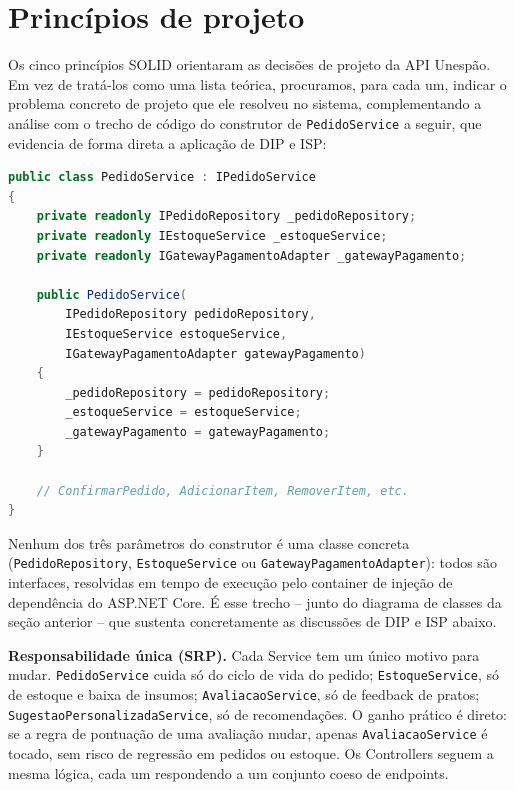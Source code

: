 \documentclass[a4paper,12pt,oneside,openany]{book}
\begin{document}
\section{Princípios de projeto}

Os cinco princípios SOLID orientaram as decisões de projeto da API Unespão. Em vez de tratá-los como uma lista teórica, procuramos, para cada um, indicar o problema concreto de projeto que ele resolveu no sistema, complementando a análise com o trecho de código do construtor de \texttt{PedidoService} a seguir, que evidencia de forma direta a aplicação de DIP e ISP:

\begin{lstlisting}[language=csharp, caption={Construtor de \texttt{PedidoService}, com suas três dependências expressas como interfaces.}]
public class PedidoService : IPedidoService
{
    private readonly IPedidoRepository _pedidoRepository;
    private readonly IEstoqueService _estoqueService;
    private readonly IGatewayPagamentoAdapter _gatewayPagamento;

    public PedidoService(
        IPedidoRepository pedidoRepository,
        IEstoqueService estoqueService,
        IGatewayPagamentoAdapter gatewayPagamento)
    {
        _pedidoRepository = pedidoRepository;
        _estoqueService = estoqueService;
        _gatewayPagamento = gatewayPagamento;
    }

    // ConfirmarPedido, AdicionarItem, RemoverItem, etc.
}
\end{lstlisting}

Nenhum dos três parâmetros do construtor é uma classe concreta (\texttt{PedidoRepository}, \texttt{EstoqueService} ou \texttt{GatewayPagamentoAdapter}): todos são interfaces, resolvidas em tempo de execução pelo container de injeção de dependência do ASP.NET Core. É esse trecho -- junto do diagrama de classes da seção anterior -- que sustenta concretamente as discussões de DIP e ISP abaixo.

\textbf{Responsabilidade única (SRP).} Cada Service tem um único motivo para mudar. \texttt{PedidoService} cuida só do ciclo de vida do pedido; \texttt{EstoqueService}, só de estoque e baixa de insumos; \texttt{AvaliacaoService}, só de feedback de pratos; \texttt{SugestaoPersonalizadaService}, só de recomendações. O ganho prático é direto: se a regra de pontuação de uma avaliação mudar, apenas \texttt{AvaliacaoService} é tocado, sem risco de regressão em pedidos ou estoque. Os Controllers seguem a mesma lógica, cada um respondendo a um conjunto coeso de endpoints.
\end{document}
